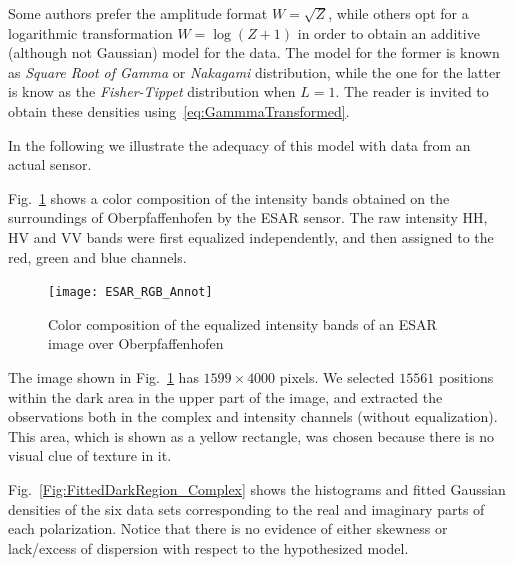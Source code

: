 \documentclass{beamer}
\begin{document}
\begin{frame}
Some authors prefer the amplitude format $W=\sqrt{Z}$, while others opt for a logarithmic transformation $W=\log(Z+1)$ in order to obtain an additive (although not Gaussian) model for the data.
The model for the former is known as \textit{Square Root of Gamma} or \textit{Nakagami} distribution,
while the one for the latter is know as the \textit{Fisher-Tippet} distribution when $L=1$.
The reader is invited to obtain these densities using~\eqref{eq:GammmaTransformed}.

In the following we illustrate the adequacy of this model with data from an actual sensor.

Fig.~\ref{Im:Oberpfaffenhofen_RGB} shows a color composition of the intensity bands obtained on the surroundings of Oberpfaffenhofen by the ESAR sensor.
The raw intensity HH, HV and VV bands were first equalized independently, and then assigned to the red, green and blue channels.

\begin{figure}
\centering
\texttt{[image: ESAR\_RGB\_Annot]}
\caption{Color composition of the equalized intensity bands of an ESAR image over Oberpfaffenhofen}\label{Im:Oberpfaffenhofen_RGB}
\end{figure}

The image shown in Fig.~\ref{Im:Oberpfaffenhofen_RGB} has $1599\times4000$ pixels.
We selected $15561$ positions within the dark area in the upper part of the image, and extracted the observations both in the complex and intensity channels (without equalization).
This area, which is shown as a yellow rectangle, was chosen because there is no visual clue of texture in it.

Fig.~\ref{Fig:FittedDarkRegion_Complex} shows the histograms and fitted Gaussian densities of the six data sets corresponding to the real and imaginary parts of each polarization.
Notice that there is no evidence of either skewness or lack/excess of dispersion with respect to the hypothesized model.


\end{frame}
\end{document}
